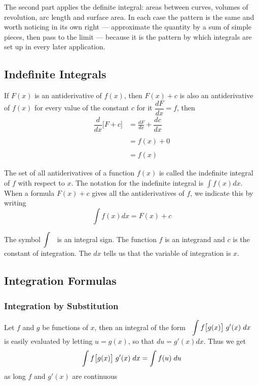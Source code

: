 \documentclass[11pt,a4paper]{article}
\theoremstyle{definition}
\begin{document}
The second part applies the definite integral: areas between curves, volumes of
revolution, arc length and surface area. In each case the pattern is the same
and worth noticing in its own right --- approximate the quantity by a sum of
simple pieces, then pass to the limit --- because it is the pattern by which
integrals are set up in every later application.


\subsection{Indefinite Integrals}
If $F(x)$ is an antiderivative of $f(x)$, then $F(x) + c$ is also an antiderivative of $f(x)$ for every value of the constant $c$ for it $\dfrac{dF}{dx} = f$, then 
\begin{align*}
\dfrac{d}{dx}\big[F + c\big] & = \frac{d F}{dx} + \dfrac{d c}{dx}\\\\
& = f(x) + 0\\\\
& = f(x)
\end{align*}

The set of all antiderivatives of a function $f(x)$ is called the indefinite integral of $f$ with respect to $x$. The notation for the indefinite integral is $\displaystyle{\int f(x)dx}$. When a formula $F(x) + c$ gives all the antiderivatives of $f$, we indicate this by writing $$\int f(x) dx = F(x) + c$$

The symbol $\displaystyle{\int}\hspace{0.2cm}$ is an integral sign. The function $f$ is an integrand and $c$ is the constant of integration. The $dx$ tells us that the variable of integration is $x$.


\subsection{Integration Formulas}

\subsubsection{Integration by Substitution}
Let $f$ and $g$ be functions of $x$, then an integral of the form $\hspace{0.2cm}\displaystyle{\int f\big[g(x)\big]\hspace{0.1cm}g'(x)\hspace{0.1cm}dx \hspace{0.1cm}}$ is easily evaluated by letting $u = g(x)$, so that $du = g'(x)dx$. Thus we get $$\int f\big[g(x)\big]\hspace{0.1cm}g'(x)\hspace{0.1cm}dx = \int f(u)\hspace{0.1cm}du$$
as long $f$ and $g'(x)$ are continuous
\end{document}
